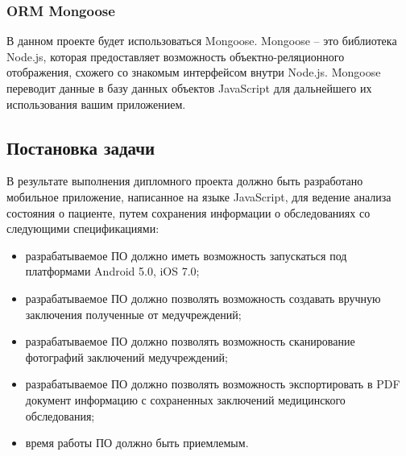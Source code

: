 \subsubsection{ORM Mongoose}

В данном проекте будет использоваться Mongoose. Mongoose -- это библиотека Node.js, которая предоставляет возможность объектно-реляционного отображения, схожего со знакомым интерфейсом внутри Node.js. Mongoose переводит данные в базу данных объектов JavaScript для дальнейшего их использования вашим приложением.

\subsection{Постановка задачи}
\label{sub:domain:task}
В результате выполнения дипломного проекта должно быть разработано мобильное приложение, написанное на языке JavaScript, для ведение анализа состояния о пациенте, путем сохранения информации о обследованиях со следующими спецификациями:
\begin{itemize}
  \item разрабатываемое ПО должно иметь возможность запускаться под платформами Android 5.0, iOS 7.0;
  \item разрабатываемое ПО должно позволять возможность создавать вручную заключения полученные от медучреждений;
  \item разрабатываемое ПО должно позволять возможность сканирование фотографий заключений медучреждений;
  \item разрабатываемое ПО должно позволять возможность экспортировать в PDF документ информацию с сохраненных заключений медицинского обследования;
  \item время работы ПО должно быть приемлемым.
\end{itemize}